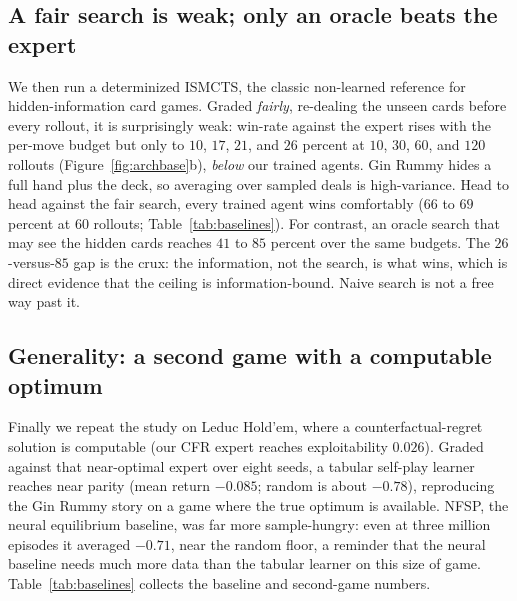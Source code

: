 \documentclass[letterpaper]{article} %
\begin{document}
\subsection{A fair search is weak; only an oracle beats the expert}
We then run a determinized ISMCTS, the classic non-learned reference for
hidden-information card games. Graded \emph{fairly}, re-dealing the unseen cards
before every rollout, it is surprisingly weak: win-rate against the expert rises
with the per-move budget but only to $10$, $17$, $21$, and $26$ percent at $10$,
$30$, $60$, and $120$ rollouts (Figure~\ref{fig:archbase}b), \emph{below}
our trained agents. Gin Rummy hides a full hand plus the deck, so averaging over
sampled deals is high-variance. Head to head against the fair search, every
trained agent wins comfortably ($66$ to $69$ percent at $60$ rollouts;
Table~\ref{tab:baselines}). For contrast, an oracle search that may see the hidden
cards reaches $41$ to $85$ percent over the same budgets. The $26$-versus-$85$
gap is the crux: the information, not the search, is what wins, which is direct
evidence that the ceiling is information-bound. Naive search is not a free way
past it.

\subsection{Generality: a second game with a computable optimum}
Finally we repeat the study on Leduc Hold'em, where a counterfactual-regret
solution is computable (our CFR expert reaches exploitability $0.026$). Graded
against that near-optimal expert over eight seeds, a tabular self-play learner
reaches near parity (mean return $-0.085$; random is about $-0.78$), reproducing
the Gin Rummy story on a game where the true optimum is available. NFSP, the
neural equilibrium baseline, was far more sample-hungry: even at three million
episodes it averaged $-0.71$, near the random floor, a reminder that the
neural baseline needs much more data than the tabular learner on this size of
game. Table~\ref{tab:baselines} collects the baseline and second-game numbers.
\end{document}
